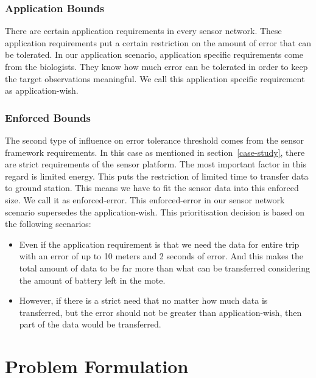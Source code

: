 \documentclass[conference]{IEEEtran}
\begin{document}
\subsubsection{Application Bounds}There are certain application requirements in every sensor network. These application requirements put a certain restriction on the amount of error that can be tolerated. In our application scenario, application specific requirements come from the biologists. They know how much error can be tolerated in order to keep the target observations meaningful. We call this application specific requirement as application-wish.

\subsubsection{Enforced Bounds}The second type of influence on error tolerance threshold comes from the sensor framework requirements. In this case as mentioned in section~\ref{case-study}, there are strict requirements of the sensor platform. The most important factor in this regard is limited energy. This puts the restriction of limited time to transfer data to ground station. This means we have to fit the sensor data into this enforced size. We call it as enforced-error. This enforced-error in our sensor network scenario supersedes the application-wish. This prioritisation decision is based on the following scenarios:

\begin{itemize}
\item Even if the application requirement is that we need the data for entire trip with an error of up to 10 meters and 2 seconds of error. And this makes the total amount of data to be far more than what can be transferred considering the amount of battery left in the mote.
\item However, if there is a strict need that no matter how much data is transferred, but the error should not be greater than application-wish, then part of the data would be transferred. 
\end{itemize}

\section{Problem Formulation}\label{sec:problem}
\end{document}
